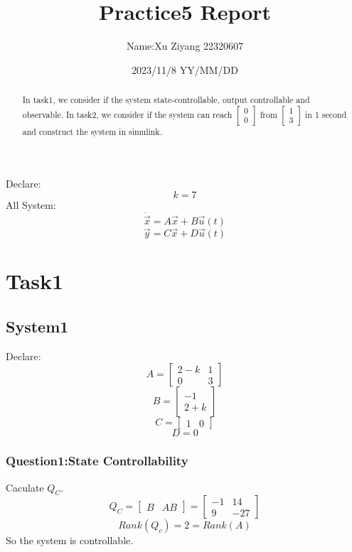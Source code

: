 \documentclass[12pt,a4paper,oneside]{ctexart}
\title{\textbf{Practice5 Report}}
\author{Name:Xu Ziyang 22320607}
\date{2023/11/8 YY/MM/DD}
\begin{document}
\maketitle
\begin{abstract}
    In task1, we consider if the system state-controllable, output controllable and observable.
    In task2, we consider if the system can reach 
    $\begin{bmatrix}
        0\\
        0
    \end{bmatrix}$
    from 
    $\begin{bmatrix}
        1\\
        3
    \end{bmatrix}$ in 1 second and construct the system in simulink.
\end{abstract}
\newpage
Declare:$$k=7$$
All System:
$$\dot{\vec{x}} = A\vec{x} + B\vec{u}(t)$$
$$\vec{y} = C\vec{x} + D\vec{u}(t)$$
    \section{Task1}
        \subsection{System1}
        Declare:
            $$
            A=\begin{bmatrix}
                2-k&1\\
                0&3
            \end{bmatrix}
            $$
            $$
            B=\begin{bmatrix}
                -1\\
                2+k
            \end{bmatrix}
            $$
            $$
            C=\begin{bmatrix}
                1&0
            \end{bmatrix}
            $$
            $$
            D=0
            $$
            \subsubsection{Question1:State Controllability}
                Caculate $Q_C$.
                $$Q_C = \begin{bmatrix}
                    B&AB
                \end{bmatrix} = \begin{bmatrix}
                    -1&14\\
                    9&-27
                \end{bmatrix}$$
                $$Rank(Q_c)=2=Rank(A)$$
                So the system is controllable.
\end{document}
